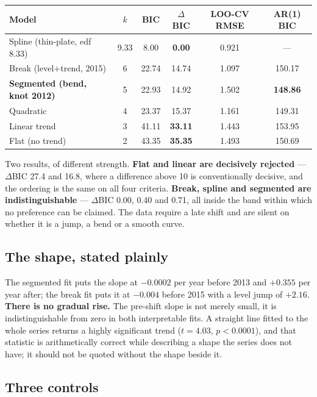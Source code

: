 \begin{center}
\begin{tabular}{lccccc}
\toprule
Model & $k$ & BIC & $\Delta$BIC & LOO-CV RMSE & AR(1) BIC \\
\midrule
Spline (thin-plate, edf 8.33) & 9.33 & 8.00 & \textbf{0.00} & 0.921 & --- \\
Break (level$+$trend, 2015) & 6 & 22.74 & 14.74 & 1.097 & 150.17 \\
\textbf{Segmented (bend, knot 2012)} & 5 & 22.93 & 14.92 & 1.502 & \textbf{148.86} \\
Quadratic & 4 & 23.37 & 15.37 & 1.161 & 149.31 \\
Linear trend & 3 & 41.11 & \textbf{33.11} & 1.443 & 153.95 \\
Flat (no trend) & 2 & 43.35 & \textbf{35.35} & 1.493 & 150.69 \\
\bottomrule
\end{tabular}
\end{center}

Two results, of different strength. \textbf{Flat and linear are decisively rejected} --- $\Delta$BIC
27.4 and 16.8, where a difference above 10 is conventionally decisive, and the ordering is the same
on all four criteria. \textbf{Break, spline and segmented are indistinguishable} --- $\Delta$BIC
0.00, 0.40 and 0.71, all inside the band within which no preference can be claimed. The data
require a late shift and are silent on whether it is a jump, a bend or a smooth curve.

\subsection*{The shape, stated plainly}

The segmented fit puts the slope at $-0.0002$ per year before 2013 and $+0.355$ per year after; the
break fit puts it at $-0.004$ before 2015 with a level jump of $+2.16$. \textbf{There is no gradual
rise.} The pre-shift slope is not merely small, it is indistinguishable from zero in both
interpretable fits. A straight line fitted to the whole series returns a highly significant trend
($t=4.03$, $p<0.0001$), and that statistic is arithmetically correct while describing a shape the
series does not have; it should not be quoted without the shape beside it.

\subsection*{Three controls}

